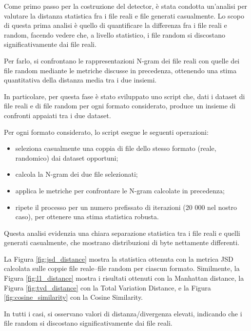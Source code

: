 \documentclass{report}
\begin{document}
Come primo passo per la costruzione del detector, è stata condotta un'analisi per valutare la distanza statistica fra i file reali e file generati casualmente.
Lo scopo di questa prima analisi è quello di quantificare la differenza fra i file reali e random, facendo vedere che, a livello statistico, i file random si discostano significativamente dai file reali.

Per farlo, si confrontano le rappresentazioni N-gram dei file reali con quelle dei file random mediante le metriche discusse in precedenza, ottenendo una stima quantitativa della distanza media tra i due insiemi.
\bigskip

In particolare, per questa fase è stato sviluppato uno script che, dati i dataset di file reali e di file random per ogni formato considerato,
produce un insieme di confronti appaiati tra i due dataset.

\bigskip

Per ogni formato considerato, lo script esegue le seguenti operazioni:
\begin{itemize}
    \item seleziona casualmente una coppia di file dello stesso formato (reale, randomico) dai dataset opportuni;
    \item calcola la N-gram dei due file selezionati;
    \item applica le metriche per confrontare le N-gram calcolate in precedenza;
    \item ripete il processo per un numero prefissato di iterazioni (20 000 nel nostro caso), per ottenere una stima statistica robusta.
\end{itemize}

Questa analisi evidenzia una chiara separazione statistica tra i file reali e quelli generati casualmente,
che mostrano distribuzioni di byte nettamente differenti.
\bigskip


La Figura \ref{fig:jsd_distance} mostra la statistica ottenuta con la metrica JSD calcolata sulle coppie file reale--file random per ciascun formato.
Similmente, la Figura \ref{fig:l1_distance} mostra i risultati ottenuti con la Manhattan distance,
la Figura \ref{fig:tvd_distance} con la Total Variation Distance,
e la Figura \ref{fig:cosine_similarity} con la Cosine Similarity.

\bigskip

In tutti i casi, si osservano valori di distanza/divergenza elevati, indicando che i file random si discostano significativamente dai file reali.
\end{document}
